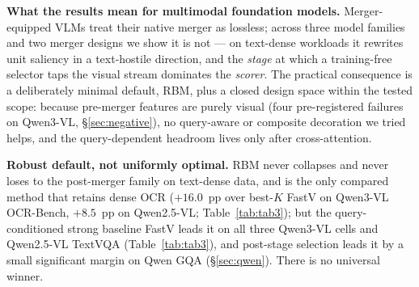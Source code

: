 \documentclass[sigconf,review,anonymous]{acmart}
\begin{document}
\textbf{What the results mean for multimodal foundation models.} Merger-equipped
VLMs treat their native merger as lossless; across three model families and two
merger designs we show it is not --- on text-dense workloads it rewrites unit
saliency in a text-hostile direction, and the \emph{stage} at which a
training-free selector taps the visual stream dominates the \emph{scorer}. The
practical consequence is a deliberately minimal default, RBM, plus a closed
design space within the tested scope: because pre-merger features are purely
visual (four pre-registered failures on Qwen3-VL, \S\ref{sec:negative}), no
query-aware or composite decoration we tried helps, and the query-dependent
headroom lives only after cross-attention.

\textbf{Robust default, not uniformly optimal.} RBM never collapses and never
loses to the post-merger family on text-dense data, and is the only compared
method that retains dense OCR ($+16.0$~pp over best-$K$ FastV on Qwen3-VL
OCR-Bench, $+8.5$~pp on Qwen2.5-VL; Table~\ref{tab:tab3}); but the
query-conditioned strong baseline FastV leads it on all three Qwen3-VL cells
and Qwen2.5-VL TextVQA (Table~\ref{tab:tab3}), and post-stage
selection leads it by a small significant margin on Qwen GQA (\S\ref{sec:qwen}).
There is no universal winner.
\end{document}

